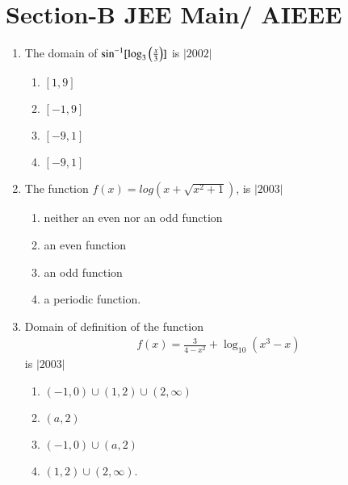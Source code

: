 \documentclass[journal,12pt,twocolumn,article]{IEEEtran}
\theoremstyle{remark}
\begin{document}
   \section*{Section-B JEE Main/ AIEEE}
	  \begin{enumerate}
		  \item The domain of $\sin^{-1}[\log_3\left(\frac{x}{3}\right)]$ is 
			  \hfill$|2002|$
			  \begin{enumerate}
		  \item $[1,9]$    
		  \item $[-1,9]$    
		  \item $[-9,1]$     
		  \item $[-9,1]$
			  \end{enumerate}
		  \item The function $f(x)=log(x+\sqrt{x^2+1})$, is 
			  \hfill$|2003|$
			  \begin{enumerate}[label=(\alph*)]
		  \item neither an even nor an odd function
		  \item an even function
		  \item an odd function
		  \item a periodic function.
			  \end{enumerate}
		  \item Domain of definition of the function 
			  \begin{align*}
				  f(x)=\frac{3}{4-x^2}+\log_{10}(x^3-x)
			  \end{align*}
			  is 
			  \hfill$|2003|$
			  \begin{enumerate}[label=(\alph*)]
		  \item $(-1,0)\cup(1,2)\cup(2,\infty)$     
		  \item $(a,2)$
		  \item $(-1,0)\cup(a,2)$                   
		  \item $(1,2)\cup(2,\infty)$.
			  \end{enumerate}
	  \end{enumerate}
\end{document}
